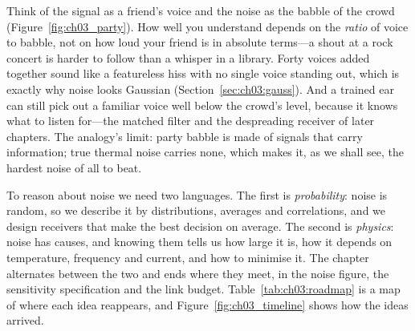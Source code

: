 \begin{analogy}
Think of the signal as a friend's voice and the noise as the babble of the crowd
(Figure~\ref{fig:ch03_party}). How well you understand depends on the \emph{ratio} of voice to
babble, not on how loud your friend is in absolute terms---a shout at a rock concert is harder to
follow than a whisper in a library. Forty voices added together sound like a featureless hiss
with no single voice standing out, which is exactly why noise looks Gaussian
(Section~\ref{sec:ch03:gauss}). And a trained ear can still pick out a familiar voice well below
the crowd's level, because it knows what to listen for---the matched filter and the despreading
receiver of later chapters. The analogy's limit: party babble is made of signals that carry
information; true thermal noise carries none, which makes it, as we shall see, the hardest noise
of all to beat.
\end{analogy}


To reason about noise we need two languages. The first is \emph{probability}: noise is
random, so we describe it by distributions, averages and correlations, and we design receivers
that make the best decision on average. The second is \emph{physics}: noise has causes, and
knowing them tells us how large it is, how it depends on temperature, frequency and current, and
how to minimise it. The chapter alternates between the two and ends where they meet, in the noise
figure, the sensitivity specification and the link budget. Table~\ref{tab:ch03:roadmap} is a map
of where each idea reappears, and Figure~\ref{fig:ch03_timeline} shows how the ideas arrived.

